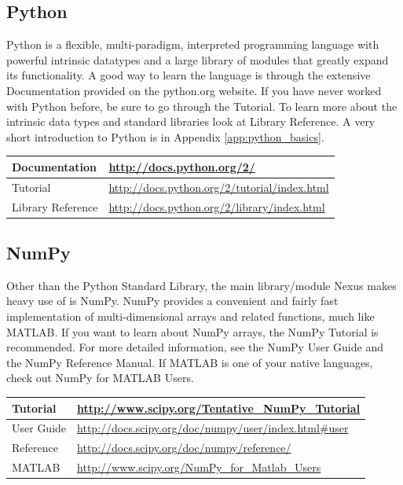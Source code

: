 \documentclass[oneside,11pt]{memoir}
\numberwithin{equation}{section}
\begin{document}
\subsection{Python}
Python is a flexible, multi-paradigm, interpreted programming language with 
powerful intrinsic datatypes and a large library of modules that greatly expand 
its functionality.  A good way to learn the language is through the extensive 
Documentation provided on the python.org website. If you have never worked with 
Python before, be sure to go through the Tutorial. To learn more about the 
intrinsic data types and standard libraries look at Library Reference.
A very short introduction to Python is in Appendix \ref{app:python_basics}.
\begin{center}
  \begin{tabular}{|l|l|}
    \hline
    Documentation      & \url{http://docs.python.org/2/}\\ \hline
    Tutorial           & \url{http://docs.python.org/2/tutorial/index.html}\\ \hline
    Library Reference  & \url{http://docs.python.org/2/library/index.html}\\ \hline
  \end{tabular}
\end{center}

\subsection{NumPy}
Other than the Python Standard Library, the main library/module Nexus 
makes heavy use of is NumPy.  NumPy provides a convenient and fairly 
fast implementation of multi-dimensional arrays and related functions, much like 
MATLAB.  If you want to learn about NumPy arrays, the NumPy 
Tutorial is recommended.  For more detailed information, see the NumPy User Guide 
and the NumPy Reference Manual. If MATLAB is one of your native languages, check out 
NumPy for MATLAB Users.
\begin{center}
  \begin{tabular}{|l|l|}
    \hline
    Tutorial   & \url{http://www.scipy.org/Tentative_NumPy_Tutorial}\\ \hline
    User Guide & \url{http://docs.scipy.org/doc/numpy/user/index.html#user}\\ \hline
    Reference  & \url{http://docs.scipy.org/doc/numpy/reference/}\\ \hline
    MATLAB     & \url{http://www.scipy.org/NumPy_for_Matlab_Users}\\ \hline
 \end{tabular}
\end{center}
\end{document}
